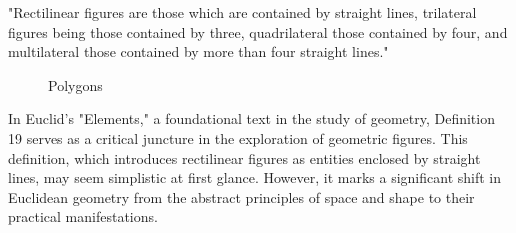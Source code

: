 
\begin{defin}
"Rectilinear figures are those which are contained by straight lines, trilateral figures being those contained by three, quadrilateral those contained by four, and multilateral those contained by more than four straight lines."
\end{defin}

\begin{figure}[H]
\begin{centering}
	\begin{subfigure}{0.3\textwidth}
	\end{subfigure}
	\hfill
	\begin{subfigure}{0.3\textwidth}
	\end{subfigure}
	\hfill
	\begin{subfigure}{0.3\textwidth}
	\end{subfigure}
\end{centering}
\caption{Polygons}
\end{figure}


In Euclid's "Elements," a foundational text in the study of geometry, Definition 19 serves as a critical juncture in the exploration of geometric figures. This definition, which introduces rectilinear figures as entities enclosed by straight lines, may seem simplistic at first glance. However, it marks a significant shift in Euclidean geometry from the abstract principles of space and shape to their practical manifestations.

